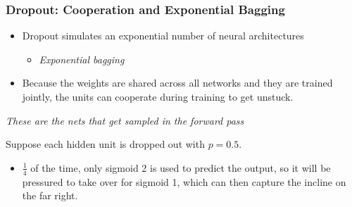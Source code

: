\subsubsection{Dropout: Cooperation and Exponential Bagging}
\begin{summary}
    \begin{itemize}
        \item Dropout simulates an exponential number of neural architectures 
        \begin{itemize}
            \item \textit{Exponential bagging}
        \end{itemize}
        
        \item Because the weights are shared across all networks and they are trained jointly, the units can cooperate during training to get unstuck.
    \end{itemize}
    
    
    \textit{These are the nets that get sampled in the forward pass}
\end{summary}


\begin{example}
    Suppose each hidden unit is dropped out with \( p = 0.5 \).


    \begin{itemize}
        \item \( \frac{1}{4} \) of the time, only sigmoid 2 is used to predict the output, so it will be pressured to take over for sigmoid 1, which can then capture the incline on the far right.
    \end{itemize}
\end{example}